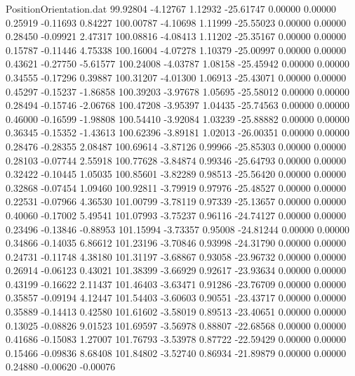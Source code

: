 \begin{filecontents}{PositionOrientation.dat}
  99.92804   -4.12767    1.12932   -25.61747    0.00000    0.00000    0.25919   -0.11693    0.84227
 100.00787   -4.10698    1.11999   -25.55023    0.00000    0.00000    0.28450   -0.09921    2.47317
 100.08816   -4.08413    1.11202   -25.35167    0.00000    0.00000    0.15787   -0.11446    4.75338
 100.16004   -4.07278    1.10379   -25.00997    0.00000    0.00000    0.43621   -0.27750   -5.61577
 100.24008   -4.03787    1.08158   -25.45942    0.00000    0.00000    0.34555   -0.17296    0.39887
 100.31207   -4.01300    1.06913   -25.43071    0.00000    0.00000    0.45297   -0.15237   -1.86858
 100.39203   -3.97678    1.05695   -25.58012    0.00000    0.00000    0.28494   -0.15746   -2.06768
 100.47208   -3.95397    1.04435   -25.74563    0.00000    0.00000    0.46000   -0.16599   -1.98808
 100.54410   -3.92084    1.03239   -25.88882    0.00000    0.00000    0.36345   -0.15352   -1.43613
 100.62396   -3.89181    1.02013   -26.00351    0.00000    0.00000    0.28476   -0.28355    2.08487
 100.69614   -3.87126    0.99966   -25.85303    0.00000    0.00000    0.28103   -0.07744    2.55918
 100.77628   -3.84874    0.99346   -25.64793    0.00000    0.00000    0.32422   -0.10445    1.05035
 100.85601   -3.82289    0.98513   -25.56420    0.00000    0.00000    0.32868   -0.07454    1.09460
 100.92811   -3.79919    0.97976   -25.48527    0.00000    0.00000    0.22531   -0.07966    4.36530
 101.00799   -3.78119    0.97339   -25.13657    0.00000    0.00000    0.40060   -0.17002    5.49541
 101.07993   -3.75237    0.96116   -24.74127    0.00000    0.00000    0.23496   -0.13846   -0.88953
 101.15994   -3.73357    0.95008   -24.81244    0.00000    0.00000    0.34866   -0.14035    6.86612
 101.23196   -3.70846    0.93998   -24.31790    0.00000    0.00000    0.24731   -0.11748    4.38180
 101.31197   -3.68867    0.93058   -23.96732    0.00000    0.00000    0.26914   -0.06123    0.43021
 101.38399   -3.66929    0.92617   -23.93634    0.00000    0.00000    0.43199   -0.16622    2.11437
 101.46403   -3.63471    0.91286   -23.76709    0.00000    0.00000    0.35857   -0.09194    4.12447
 101.54403   -3.60603    0.90551   -23.43717    0.00000    0.00000    0.35889   -0.14413    0.42580
 101.61602   -3.58019    0.89513   -23.40651    0.00000    0.00000    0.13025   -0.08826    9.01523
 101.69597   -3.56978    0.88807   -22.68568    0.00000    0.00000    0.41686   -0.15083    1.27007
 101.76793   -3.53978    0.87722   -22.59429    0.00000    0.00000    0.15466   -0.09836    8.68408
 101.84802   -3.52740    0.86934   -21.89879    0.00000    0.00000    0.24880   -0.00620   -0.00076

\end{filecontents}
